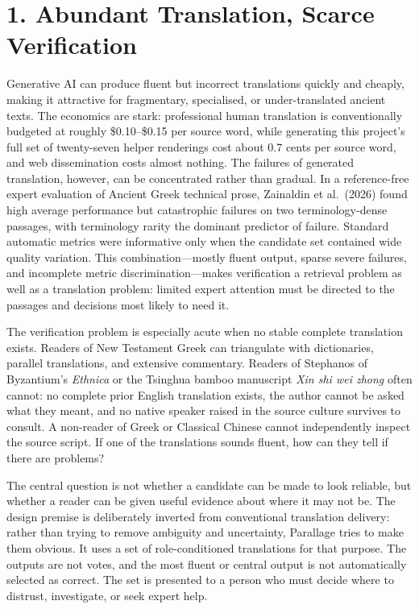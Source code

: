 \documentclass[
  12pt,
]{article}
\begin{document}
\section{1. Abundant Translation, Scarce
Verification}\label{abundant-translation-scarce-verification}

Generative AI can produce fluent but incorrect translations quickly and
cheaply, making it attractive for fragmentary, specialised, or
under-translated ancient texts. The economics are stark: professional
human translation is conventionally budgeted at roughly
\$0.10--\$0.15 per source word, while generating this project's full
set of twenty-seven helper renderings cost about 0.7 cents per source
word, and web dissemination costs almost nothing. The failures of
generated translation, however, can be concentrated rather
than gradual. In a reference-free expert evaluation of Ancient Greek
technical prose, Zainaldin et al.~(2026) found high average performance
but catastrophic failures on two terminology-dense passages, with
terminology rarity the dominant predictor of failure. Standard automatic
metrics were informative only when the candidate set contained wide
quality variation. This combination---mostly fluent output, sparse
severe failures, and incomplete metric discrimination---makes
verification a retrieval problem as well as a translation problem:
limited expert attention must be directed to the passages and decisions
most likely to need it.

The verification problem is especially acute when no stable complete
translation exists. Readers of New Testament Greek can triangulate with
dictionaries, parallel translations, and extensive commentary. Readers
of Stephanos of Byzantium's \emph{Ethnica} or the Tsinghua bamboo
manuscript \emph{Xin shi wei zhong} often cannot: no complete prior
English translation exists, the author cannot be asked what they meant,
and no native speaker raised in the source culture survives to consult.
A non-reader of Greek
or Classical Chinese cannot independently inspect the source script. If
one of the translations sounds fluent, how can they tell if there are
problems?

The central question is not whether a candidate can be made to look
reliable, but whether a reader can be given useful evidence about where
it may not be. The design premise is deliberately inverted from
conventional translation delivery: rather than trying to remove
ambiguity and uncertainty, Parallage tries to make them obvious. It uses
a set of role-conditioned translations for
that purpose. The outputs are not votes, and the most fluent or central
output is not automatically selected as correct. The set is presented to
a person who must decide where to distrust, investigate, or seek expert
help.
\end{document}
